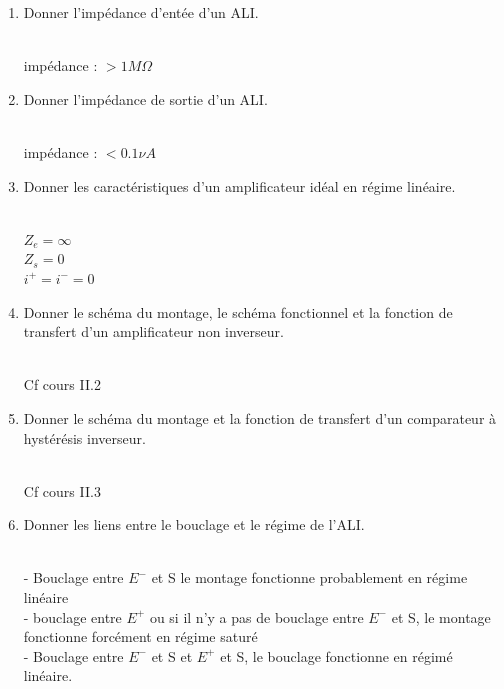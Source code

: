 \begin{enumerate}[label=\arabic{enumi} - , left=0pt, itemsep=1em]
    \item Donner l'impédance d'entée d'un ALI. \par
    \begin{solution}\\
        impédance : $> 1 M \Omega$
    \end{solution}

    \item Donner l'impédance de sortie d'un ALI. \par
    \begin{solution}\\
        impédance : $< 0.1 \nu A$
    \end{solution}

    \item Donner les caractéristiques d'un amplificateur idéal en régime linéaire. \par
    \begin{solution}\\
        $Z_e = \infty$\\
        $Z_s = 0$\\
        $i^+ = i^- = 0$
    \end{solution}

    \item Donner le schéma du montage, le schéma fonctionnel et la fonction de transfert d'un amplificateur non inverseur. \par
    \begin{solution}\\
        Cf cours II.2
    \end{solution}


    \item Donner le schéma du montage et la fonction de transfert d'un comparateur à hystérésis inverseur. \par
    \begin{solution}\\
        Cf cours II.3
    \end{solution}

    \item Donner les liens entre le bouclage et le régime de l'ALI. \par
    \begin{solution}\\
        - Bouclage entre $E^-$ et S le montage fonctionne probablement en régime linéaire\\
        - bouclage entre $E^+$ ou si il n'y a pas de bouclage entre $E^-$ et S, le montage fonctionne forcément en régime saturé\\
        - Bouclage entre $E^-$ et S et $E^+$ et S, le bouclage fonctionne en régimé linéaire.


\end{solution}
\end{enumerate}

